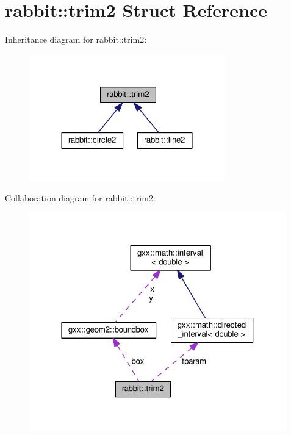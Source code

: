 \hypertarget{structrabbit_1_1trim2}{}\section{rabbit\+:\+:trim2 Struct Reference}
\label{structrabbit_1_1trim2}


Inheritance diagram for rabbit\+:\+:trim2\+:
\nopagebreak
\begin{figure}[H]
\begin{center}
\leavevmode
\includegraphics[width=240pt]{structrabbit_1_1trim2__inherit__graph}
\end{center}
\end{figure}


Collaboration diagram for rabbit\+:\+:trim2\+:
\nopagebreak
\begin{figure}[H]
\begin{center}
\leavevmode
\includegraphics[width=316pt]{structrabbit_1_1trim2__coll__graph}
\end{center}
\end{figure}
